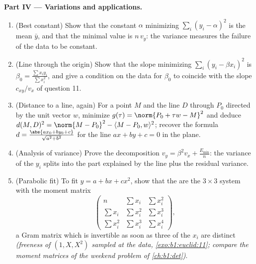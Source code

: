 \begin{problem}
\medskip
\noindent\textbf{Part IV --- Variations and applications.}
\begin{enumerate}[resume]
  \item (Best constant) Show that the constant $\alpha$
        minimizing $\sum_i (y_i - \alpha)^2$ is the mean $\bar
        y$, and that the minimal value is $n\,v_y$: the variance
        measures the failure of the data to be constant.
  \item (Line through the origin) Show that the slope minimizing
        $\sum_i (y_i - \beta x_i)^2$ is $\beta_0 = \frac{\sum
        x_iy_i}{\sum x_i^2}$, and give a condition on the data
        for $\beta_0$ to coincide with the slope
        $c_{xy}/v_x$ of question 11.
  \item (Distance to a line, again) For a point $M$ and the line
        $D$ through $P_0$ directed by the unit vector $w$,
        minimize $g(\tau) = \norm{P_0 + \tau w - M}^2$ and
        deduce $d(M, D)^2 = \norm{M - P_0}^2 - \langle M - P_0,
        w\rangle^2$; recover the formula $d = \frac{\abs{a x_0 +
        b y_0 + c}}{\sqrt{a^2 + b^2}}$ for the line $ax + by + c
        = 0$ in the plane.
  \item (Analysis of variance) Prove the decomposition $v_y =
        \beta^2 v_x + \frac{E_{\min}}n$: the variance of the
        $y_i$ splits into the part explained by the line plus
        the residual variance.
  \item (Parabolic fit) To fit $y = a + bx + cx^2$, show that
        the  are the $3 \times 3$ system with
        the moment matrix
        \[
        \begin{pmatrix}
        n & \sum x_i & \sum x_i^2\\
        \sum x_i & \sum x_i^2 & \sum x_i^3\\
        \sum x_i^2 & \sum x_i^3 & \sum x_i^4
        \end{pmatrix},
        \]
        a Gram matrix which is invertible as soon as three of
        the $x_i$ are distinct \emph{(freeness of $(1, X, X^2)$
        sampled at the data, \cref{exo:b1:euclid:11}; compare
        the moment matrices of the weekend problem of
        \cref{ch:b1:det})}.
\end{enumerate}


\end{problem}
